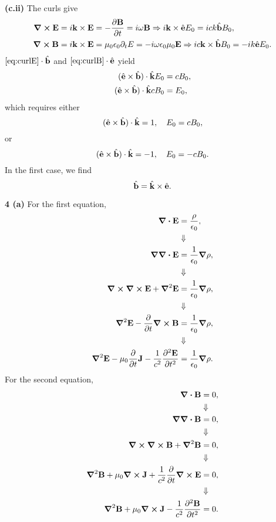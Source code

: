 \documentclass{article}
\makeatletter
\newcommand*{\shifttext}[1]{%
  \settowidth{\@tempdima}{#1}%
  \hspace{-\@tempdima}#1%
}
\newcommand{\plabel}[1]{%
\shifttext{\textbf{#1}\quad}%
}
\newcommand{\prule}{%
\begin{center}%
\hdashrule[0.5ex]{.99\linewidth}{1pt}{1pt 2.5pt}%
\end{center}%
}
\makeatother
\begin{document}
\plabel{(c.ii)}%
The curls give
\begin{align}
    \label{eq:curlE} \curl\vb{E} &= i\vb{k}\times\vb{E} = -\pdv{\vb{B}}{t} = i\omega\vb{B} \Rightarrow i\vb{k}\times\hat{\vb{e}} E_0 = ick\hat{\vb{b}} B_0, \\
    \label{eq:curlB} \curl\vb{B} &= i\vb{k}\times \vb{E} = \mu_0\epsilon_0\partial_t E = -i\omega\epsilon_0\mu_0 \vb{E}\Rightarrow ic\vb{k}\times \hat{\vb{b}}B_0 = -ik\hat{\vb{e}}E_0.
\end{align}
$\text{\Cref{eq:curlE}} \cdot \hat{\vb{b}}$ and $\text{\cref{eq:curlB}} \cdot \hat{\vb{e}}$ yield
\begin{align*}
    (\hat{\vb{e}}\times \hat{\vb{b}})\cdot\hat{\vb{k}} E_0 &= cB_0, \\
    (\hat{\vb{e}}\times \hat{\vb{b}})\cdot\hat{\vb{k}} cB_0 &= E_0,
\end{align*}
which requires either
\[ (\hat{\vb{e}}\times \hat{\vb{b}})\cdot\hat{\vb{k}} = 1,\quad E_0 = cB_0, \]
or
\[ (\hat{\vb{e}}\times \hat{\vb{b}})\cdot\hat{\vb{k}} = -1,\quad E_0 = -cB_0. \]
In the first case, we find
\[ \hat{\vb{b}} = \hat{\vb{k}} \times \hat{\vb{e}}. \]

\prule

\plabel{4 (a)}%
For the first equation,
\begin{align*}
    \div \vb{E} &= \frac{\rho}{\epsilon_0}, \\
    &\Downarrow \\
    \grad \div \vb{E} &= \frac{1}{\epsilon_0}\grad\rho, \\
    &\Downarrow \\
    \curl\curl\vb{E} + \grad^2 \vb{E} &= \frac{1}{\epsilon_0}\grad\rho, \\
    &\Downarrow \\
    \grad^2 \vb{E} - \pdv{}{t}\curl \vb{B} &= \frac{1}{\epsilon_0}\grad\rho, \\
    &\Downarrow \\
    \grad^2 \vb{E} - \mu_0\pdv{}{t}\vb{J} - \frac{1}{c^2}\pdv[2]{\vb{E}}{t} &= \frac{1}{\epsilon_0}\grad\rho.
\end{align*}
For the second equation,
\begin{align*}
    \div \vb{B} &= 0, \\
    &\Downarrow \\
    \grad \div \vb{B} &= 0, \\
    &\Downarrow \\
    \curl\curl\vb{B} + \grad^2 \vb{B} &= 0, \\
    &\Downarrow \\
    \grad^2 \vb{B} + \mu_0\curl\vb{J} + \frac{1}{c^2}\pdv{}{t} \curl \vb{E} &= 0, \\
    &\Downarrow \\
    \grad^2 \vb{B} + \mu_0\curl\vb{J} - \frac{1}{c^2}\pdv[2]{\vb{B}}{t} &= 0.
\end{align*}
\end{document}

